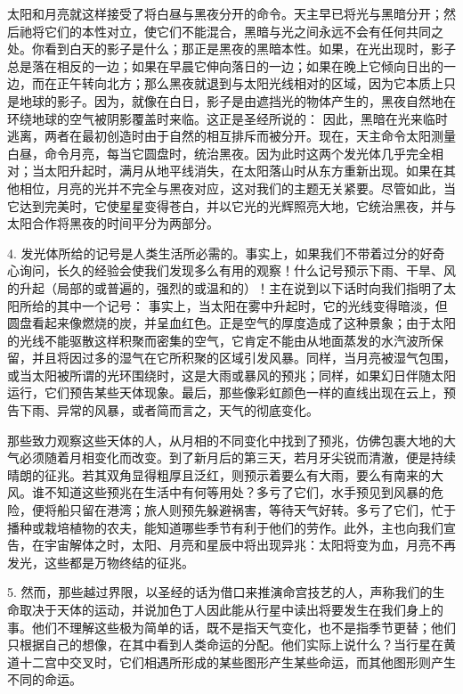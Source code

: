 太阳和月亮就这样接受了将白昼与黑夜分开的命令。天主早已将光与黑暗分开；然后祂将它们的本性对立，使它们不能混合，黑暗与光之间永远不会有任何共同之处。你看到白天的影子是什么；那正是黑夜的黑暗本性。如果，在光出现时，影子总是落在相反的一边；如果在早晨它伸向落日的一边；如果在晚上它倾向日出的一边，而在正午转向北方；那么黑夜就退到与太阳光线相对的区域，因为它本质上只是地球的影子。因为，就像在白日，影子是由遮挡光的物体产生的，黑夜自然地在环绕地球的空气被阴影覆盖时来临。这正是圣经所说的： 因此，黑暗在光来临时逃离，两者在最初创造时由于自然的相互排斥而被分开。现在，天主命令太阳测量白昼，命令月亮，每当它圆盘时，统治黑夜。因为此时这两个发光体几乎完全相对；当太阳升起时，满月从地平线消失，在太阳落山时从东方重新出现。如果在其他相位，月亮的光并不完全与黑夜对应，这对我们的主题无关紧要。尽管如此，当它达到完美时，它使星星变得苍白，并以它光的光辉照亮大地，它统治黑夜，并与太阳合作将黑夜的时间平分为两部分。\par

4.  发光体所给的记号是人类生活所必需的。事实上，如果我们不带着过分的好奇心询问，长久的经验会使我们发现多么有用的观察！什么记号预示下雨、干旱、风的升起（局部的或普遍的，强烈的或温和的）！主在说到以下话时向我们指明了太阳所给的其中一个记号： 事实上，当太阳在雾中升起时，它的光线变得暗淡，但圆盘看起来像燃烧的炭，并呈血红色。正是空气的厚度造成了这种景象；由于太阳的光线不能驱散这样积聚而密集的空气，它肯定不能由从地面蒸发的水汽波所保留，并且将因过多的湿气在它所积聚的区域引发风暴。同样，当月亮被湿气包围，或当太阳被所谓的光环围绕时，这是大雨或暴风的预兆；同样，如果幻日伴随太阳运行，它们预告某些天体现象。最后，那些像彩虹颜色一样的直线出现在云上，预告下雨、异常的风暴，或者简而言之，天气的彻底变化。\par

那些致力观察这些天体的人，从月相的不同变化中找到了预兆，仿佛包裹大地的大气必须随着月相变化而改变。到了新月后的第三天，若月牙尖锐而清澈，便是持续晴朗的征兆。若其双角显得粗厚且泛红，则预示着要么有大雨，要么有南来的大风。谁不知道这些预兆在生活中有何等用处？多亏了它们，水手预见到风暴的危险，便将船只留在港湾；旅人则预先躲避祸害，等待天气好转。多亏了它们，忙于播种或栽培植物的农夫，能知道哪些季节有利于他们的劳作。此外，主也向我们宣告，在宇宙解体之时，太阳、月亮和星辰中将出现异兆：太阳将变为血，月亮不再发光，这些都是万物终结的征兆。\par

5. 然而，那些越过界限，以圣经的话为借口来推演命宫技艺的人，声称我们的生命取决于天体的运动，并说加色丁人因此能从行星中读出将要发生在我们身上的事。他们不理解这些极为简单的话，既不是指天气变化，也不是指季节更替；他们只根据自己的想像，在其中看到人类命运的分配。他们实际上说什么？当行星在黄道十二宫中交叉时，它们相遇所形成的某些图形产生某些命运，而其他图形则产生不同的命运。\par

